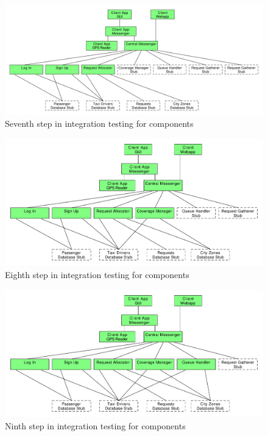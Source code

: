 \begin{figure}
\centering
\includegraphics[width=\textwidth]{tex-images/comp-7}
\caption{Seventh step in integration testing for components}
\end{figure}

\begin{figure}
\centering
\includegraphics[width=\textwidth]{tex-images/comp-8}
\caption{Eighth step in integration testing for components}
\end{figure}

\begin{figure}
\centering
\includegraphics[width=\textwidth]{tex-images/comp-9}
\caption{Ninth step in integration testing for components}
\end{figure}

